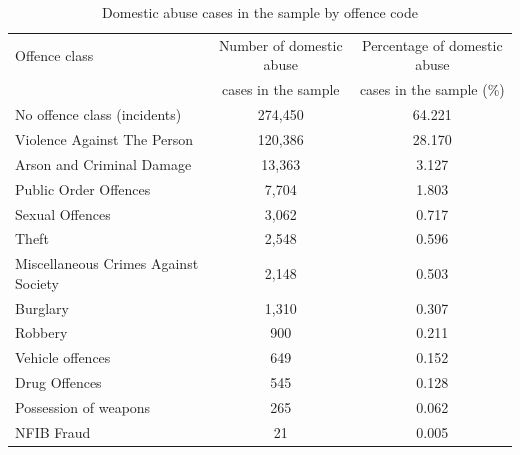 \documentclass[12pt, a4paper]{article}
\begin{document}
\begin{table}[ht]
\caption{Domestic abuse cases in the sample by offence code}
\label{crimetypes}
\centering
\begin{tabular}{lcc}
  \hline
Offence class & Number of domestic abuse & Percentage of domestic abuse \\ 
 & cases in the sample & cases in the sample (\%) \\
  \hline
  No offence class (incidents) & 274,450 & 64.221 \\ 
  Violence Against The Person & 120,386 & 28.170 \\ 
  Arson and Criminal Damage & 13,363 & 3.127 \\ 
  Public Order Offences & 7,704 & 1.803 \\ 
  Sexual Offences & 3,062 & 0.717 \\ 
  Theft & 2,548 & 0.596 \\ 
  Miscellaneous Crimes Against Society & 2,148 & 0.503 \\ 
  Burglary & 1,310 & 0.307 \\ 
  Robbery &  900 & 0.211 \\ 
  Vehicle offences &  649 & 0.152 \\ 
  Drug Offences &  545 & 0.128 \\ 
  Possession of weapons &  265 & 0.062 \\ 
  NFIB Fraud &   21 & 0.005 \\ 
   \hline
\end{tabular}
\end{table}
\end{document}
